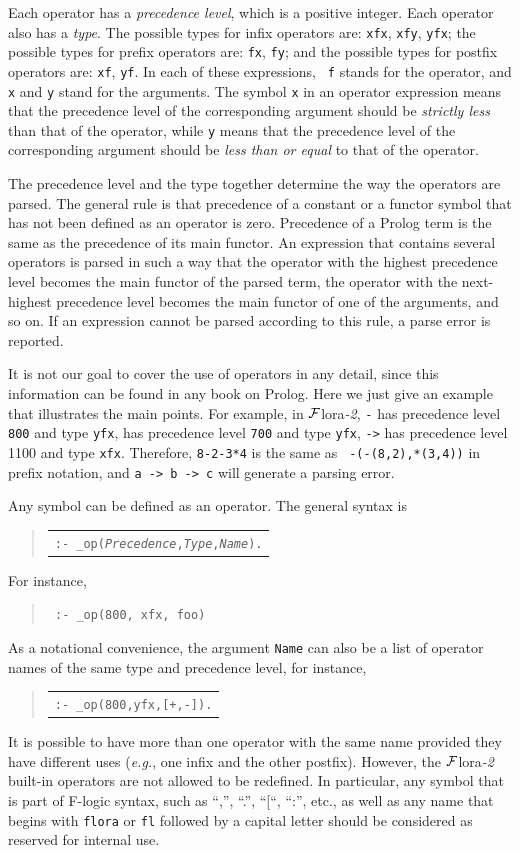 \documentclass[11pt]{article}
\newenvironment{qrules}{\begin{quote}\tt\begin{tabular}[t]{l}}%
{\end{tabular}\end{quote}}
\newcommand{\FLORA}{{\mbox{\sc ${\cal F}${lora}\rm\emph{-2}}}\xspace}
\newcommand{\fl}{\mbox{F-logic}\xspace}
\begin{document}
%
Each operator has a \emph{precedence level}, which is a positive integer.
Each operator also has a \emph{type}. The possible types for infix operators
are: {\tt xfx}, {\tt xfy}, {\tt yfx}; the possible types for prefix
operators are: {\tt fx}, {\tt fy}; and the possible types for postfix
operators are: {\tt xf}, {\tt yf}. In each of these expressions, {\tt
  f} stands for the operator, and {\tt x} and {\tt y} stand for the
arguments.  The symbol {\tt x} in an operator expression means that the
precedence level of the corresponding argument should be \emph{strictly
  less} than that of the operator, while {\tt y} means that the precedence
level of the corresponding argument should be \emph{less than or equal} to
that of the operator.

The precedence level and the type together determine the way the operators
are parsed. The general rule is that precedence of a constant or a functor
symbol that has not been defined as an operator is zero. Precedence of a
Prolog term is the same as the precedence of its main functor. 
An expression that contains several operators is parsed in such a way that
the operator with the highest precedence level becomes the main functor of
the parsed term, the operator with the next-highest precedence
level becomes the main functor of one of the arguments, and so on.
If an expression cannot be parsed according to this rule, a parse error is
reported.

It is not our goal to cover the use of operators in any detail, since this
information can be found in any book on Prolog. Here we just give an
example that illustrates the main points.  For example, in \FLORA, {\tt -}
has precedence level {\tt 800} and type {\tt yfx}, {\tt *} has precedence
level {\tt 700} and type {\tt yfx}, {\tt ->} has precedence level 1100 and
type {\tt xfx}.  Therefore, {\tt 8-2-3*4} is the same as {\tt
  -(-(8,2),*(3,4))} in prefix notation, and {\tt a -> b -> c} will generate
a parsing error.


%
Any symbol can be defined as an operator. The general syntax is
\begin{qrules}
{\tt :- \_op(\emph{Precedence},\emph{Type},\emph{Name}).}
\end{qrules}
For instance, 
\begin{quote}
 {\tt
   :- \_op(800, xfx, foo)
   }
\end{quote}
As a notational convenience, the argument {\tt Name} can also be a list of
operator names of the same type and precedence level, for instance,
\begin{qrules}
{\tt :- \_op(800,yfx,[+,-]).}
\end{qrules}
It is possible to have more than one operator with the same name provided
they have different uses ({\it e.g.}, one infix and the other postfix).
However, the \FLORA built-in operators are not allowed to be redefined.
In particular, any symbol that is part of \fl syntax, such as ``,'', ``.'',
``[``, ``:'', etc., as well as any name that begins with {\tt flora} or
{\tt fl} followed by a capital letter should be considered as reserved for
internal use.
\end{document}

